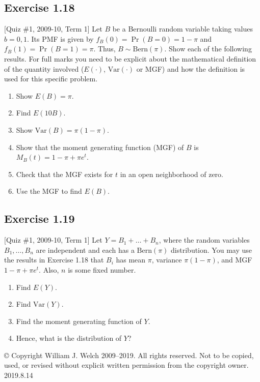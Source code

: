 \documentclass{book}
\begin{document}
\subsection{Exercise 1.18}
[Quiz \#1, 2009-10, Term 1] Let $B$ be a Bernoulli random variable taking values $b = 0, 1$. Its PMF is given by $f_B(0) = \Pr(B = 0) = 1 - \pi$ and $f_B(1) = \Pr(B = 1) = \pi$. Thus, $B \sim \text{Bern}(\pi)$. Show each of the following results. For full marks you need to be explicit about the mathematical definition of the quantity involved ($E(\cdot)$, $\text{Var}(\cdot)$ or MGF) and how the definition is used for this specific problem. 
\begin{enumerate}
    \item Show $E(B) = \pi$. 
    \item Find $E(10B)$. 
    \item Show $\text{Var}(B) = \pi(1 - \pi)$. 
    \item Show that the moment generating function (MGF) of $B$ is $M_B(t) = 1 - \pi + \pi e^t$. 
    \item Check that the MGF exists for $t$ in an open neighborhood of zero. 
    \item Use the MGF to find $E(B)$.
\end{enumerate}

\subsection{Exercise 1.19}
[Quiz \#1, 2009-10, Term 1] Let $Y = B_1 + \ldots + B_n$, where the random variables $B_1, \ldots, B_n$ are independent and each has a $\text{Bern}(\pi)$ distribution. You may use the results in Exercise 1.18 that $B_i$ has mean $\pi$, variance $\pi(1 - \pi)$, and MGF $1 - \pi + \pi e^t$. Also, $n$ is some fixed number. 
\begin{enumerate}
    \item Find $E(Y)$. 
    \item Find $\text{Var}(Y)$. 
    \item Find the moment generating function of $Y$. 
    \item Hence, what is the distribution of $Y$? 
\end{enumerate}

© Copyright William J. Welch 2009--2019. All rights reserved. Not to be copied, used, or revised without explicit written permission from the copyright owner. 2019.8.14
\end{document}
